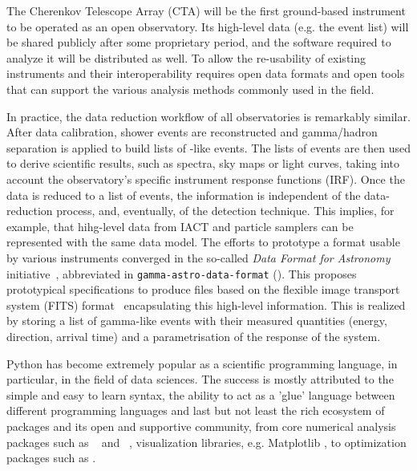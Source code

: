 \documentclass[traditabstract, longauth]{aa}
\begin{document}
The Cherenkov Telescope Array (CTA) will be the first ground-based \gammaray instrument to be operated
as an open observatory. Its high-level data (e.g. the event list) will be shared publicly after
some proprietary period, and the software required to analyze it will be distributed
as well. To allow the re-usability of existing instruments and their interoperability
requires open data formats and open tools that can support the various analysis methods
commonly used in the field.

In practice, the data reduction workflow of all \gammaray observatories
is remarkably similar. After data calibration, shower events are reconstructed and
gamma/hadron separation is applied to build lists of \gammaray-like events.
The lists of \gammaray events are then used to derive scientific results, such as spectra, sky maps
or light curves, taking into account the observatory's specific instrument response functions (IRF).
Once the data is reduced to a list of events, the information is independent of
the data-reduction process, and, eventually, of the detection technique. This implies,
for example, that hihg-level data from IACT and particle samplers can be represented
with the same data model. The efforts to prototype a format usable by various instruments
converged in the so-called \textit{Data Format for \gammaray Astronomy}
initiative~\citep{gadf_proc, gadf_universe}, abbreviated in
\texttt{gamma-astro-data-format} (\gadf). This proposes prototypical
specifications to produce files based on the flexible image transport system
(FITS) format~\citep{fits} encapsulating this high-level information. This is
realized by storing a list of gamma-like events with their measured quantities
(energy, direction, arrival time) and a parametrisation of the response of the
system. %

Python has become extremely popular as a scientific programming language,
in particular, in the field of data sciences. The success is
mostly attributed to the simple and easy to learn syntax, the ability to act as
a 'glue' language between different programming languages and last but not least
the rich ecosystem of packages and its open and supportive community, from
core numerical analysis packages such as \numpy~\citep{numpy} and
\scipy~\citep{2020SciPy-NMeth}, visualization libraries, e.g. Matplotlib \citep{matplotlib},
to optimization packages such as \iminuit \citep{iminuit}.
\end{document}
